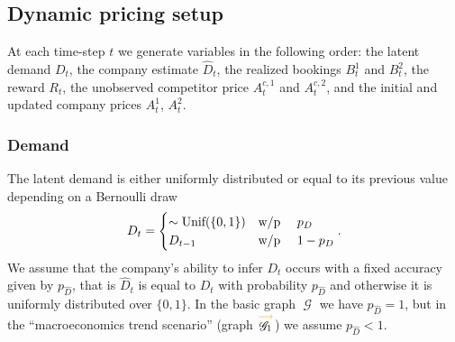 \documentclass[12pt,a4paper]{article}
\theoremstyle{definition}
\DeclareMathOperator{\gG}{\mathscr{G}}
\begin{document}
\subsection{Dynamic pricing setup}
At each time-step $t$ we generate variables in the following order: the latent demand $D_t$, the company estimate $\hat{D}_t$, the realized bookings $B^1_t$ and $B^2_t$, the reward $R_t$, the unobserved competitor price $A^{c, 1}_t$ and $A^{c, 2}_t$, and the initial and updated company prices $A^1_t$, $A^2_t$.

\subsubsection*{Demand}
The latent demand is either uniformly distributed or equal to its previous value depending on a Bernoulli draw
\[
    D_t =
    \begin{cases}
        \sim \textup{Unif}(\{0, 1\})    & \textup{w/p \quad $p_D$} \\
        D_{t-1}                             & \textup{w/p \quad $1 - p_D$} \\
    \end{cases}.
\]
We assume that the company's ability to infer $D_t$ occurs with a fixed accuracy given by $p_{\hat{D}}$, that is $\hat{D}_t$ is equal to $D_t$ with probability $p_{\hat{D}}$ and otherwise it is uniformly distributed over $\{0, 1\}$. In the basic graph $\gG$ we have $p_{\hat{D}} = 1$, but in the ``macroeconomics trend scenario'' (graph $\overset{\textcolor{graphOrange}{\longrightarrow}}{\gG_1}$) we assume $p_{\hat{D}} < 1$.
\end{document}
